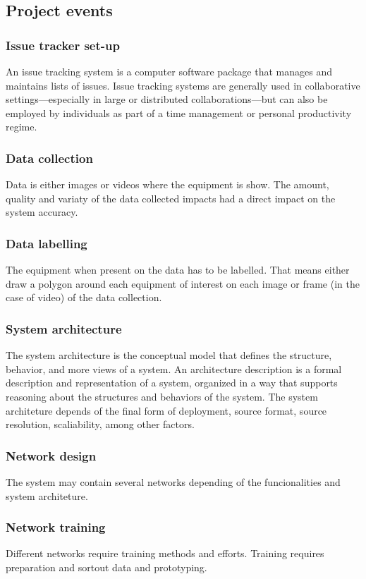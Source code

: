 \documentclass{article}
\begin{document}
\subsection{Project events}
\label{sec:org374813e}
\subsubsection{Issue tracker set-up}
\label{sec:org0c96f7d}
An issue tracking system is a computer software package that manages and maintains lists of issues.
Issue tracking systems are generally used in collaborative settings—especially in large or distributed collaborations—but can also be employed by individuals as part of a time management or personal productivity regime.
\subsubsection{Data collection}
\label{sec:orgd116119}
Data is either images or videos where the equipment is show.
The amount, quality and variaty of the data collected impacts had a direct impact on the system accuracy. 
\subsubsection{Data labelling}
\label{sec:org58f9aee}
The equipment when present on the data has to be labelled.
That means either draw a polygon around each equipment of interest on each image or frame (in the case of video) of the data collection.
\subsubsection{System architecture}
\label{sec:orgd3be870}
The system architecture is the conceptual model that defines the structure, behavior, and more views of a system.
An architecture description is a formal description and representation of a system, organized in a way that supports reasoning about the structures and behaviors of the system.
The system architeture depends of the final form of deployment, source format, source resolution, scaliability, among other factors.
\subsubsection{Network design}
\label{sec:orgd6ddc38}
The system may contain several networks depending of the funcionalities and system architeture.
\subsubsection{Network training}
\label{sec:org640b4a1}
Different networks require training methods and efforts.
Training requires preparation and sortout data and prototyping.
\end{document}
